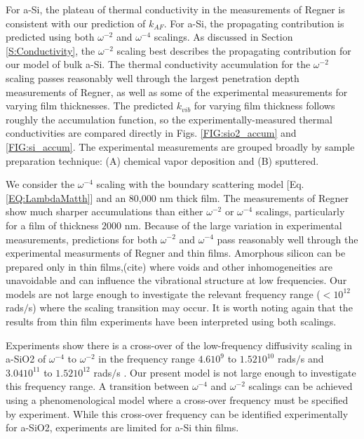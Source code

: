 \documentclass[aps,prb,onecolumn,preprint,superscriptaddress,footinbib,amsmath,amssymb,floatfix]{revtex4}
\begin{document}
For a-Si, the plateau of thermal conductivity in the   
measurements of Regner is consistent with our 
prediction of $k_{AF}$. 
For a-Si, the propagating contribution is predicted 
using both $\omega^{-2}$ and $\omega^{-4}$ scalings.  
As discussed in Section \ref{S:Conductivity}, 
the $\omega^{-2}$ scaling best describes the propagating 
contribution for our model of bulk a-Si. 
The thermal conductivity accumulation for the $\omega^{-2}$ 
scaling 
passes reasonably well through the largest penetration 
depth measurements of Regner, as well as some of the  
experimental measurements for varying film thicknesses.
The predicted $k_{vib}$ 
for varying film thickness follows roughly 
the accumulation 
function, so the experimentally-measured thermal conductivities 
are compared directly in Figs. \ref{FIG:sio2_accum} and 
\ref{FIG:si_accum}. The experimental measurements are grouped 
broadly by sample preparation technique: 
(A) chemical vapor deposition
\cite{moon_thermal_2002,liu_high_2009,yang_anomalously_2010}
and 
(B) sputtered.
\cite{kuo_thermal_1992,cahill_thermal_1994,wada_thermal_1996} 

We consider the $\omega^{-4}$ scaling with the boundary 
scattering model [Eq. \eqref{EQ:LambdaMatth}] and an 80,000 nm 
thick film. 
The measurements of Regner show much sharper accumulations 
than either $\omega^{-2}$ or $\omega^{-4}$ scalings, 
particularly for a film of thickness $2000$ nm. 
Because of the large variation in 
experimental measurements, predictions for both $\omega^{-2}$ 
and $\omega^{-4}$ pass reasonably well 
through the experimental measurments of Regner and 
thin films. 
Amorphous silicon can be
prepared only in thin films,(cite) where voids and other 
inhomogeneities are unavoidable\cite{li_effect_2011} and can 
influence the vibrational structure at low frequencies.
\cite{feldman_tight-binding_2004,liu_high_2009} Our models 
are not large enough to investigate the relevant frequency range 
($< 10^{12}$ rads$/$s) where the scaling 
transition may occur. 
It is worth noting again 
that the results from thin film experiments have been interpreted 
using both scalings.
\cite{feldman_thermal_1993,cahill_thermal_1994,
feldman_numerical_1999,liu_high_2009,yang_anomalously_2010} 

Experiments show there is a cross-over of the 
low-frequency diffusivity scaling in a-SiO2 of $\omega^{-4}$ to 
$\omega^{-2}$ in the frequency range $4.6 10^9$ to 
$1.52 10^{10}$ rads$/$s\cite{masciovecchio_evidence_2006} 
and $3.04 10^11$ to $1.52 10^{12}$ rads$/$s
\cite{baldi_emergence_2013}. 
Our present model is not 
large enough to investigate this frequency range. 
A transition between $\omega^{-4}$ and  
$\omega^{-2}$ scalings can be 
achieved using a phenomenological model where a cross-over frequency 
must be specified by experiment.
\cite{baldi_elastic_2011} While this cross-over frequency 
can be identified 
experimentally for a-SiO2,\cite{masciovecchio_evidence_2006} 
experiments are limited for a-Si thin films. 
\end{document}
